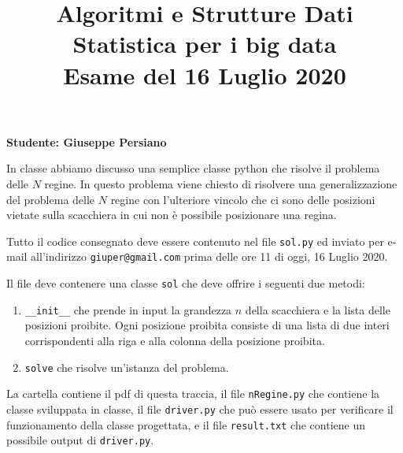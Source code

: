 \documentclass{amsart}
\begin{document}
\title{Algoritmi e Strutture Dati\\
Statistica per i big data\\
Esame del 16 Luglio 2020
}


\newcommand{\NomeStudente}{sol}
\newcommand{\nomeClasse}{sol}


\maketitle

\hfill{{\bf Studente: Giuseppe Persiano}}

\smallskip

In classe abbiamo discusso una semplice classe python che risolve il 
problema delle $N$ regine.
In questo problema viene chiesto di risolvere una generalizzazione 
del problema  delle $N$ regine con l'ulteriore vincolo che ci sono 
delle posizioni vietate sulla scacchiera in cui non \`e possibile 
posizionare una regina.


\medskip{}
Tutto il codice consegnato deve essere contenuto nel file
{\tt \nomeClasse .py} ed inviato per e-mail all'indirizzo
{\tt giuper@gmail.com} prima delle ore 11 di oggi, 16 Luglio 2020.

Il file deve contenere una classe {\tt \nomeClasse} che deve offrire
i seguenti due metodi:
\begin{enumerate}
\item {\tt \_\_init\_\_} che prende in input la grandezza $n$ della scacchiera
e la lista delle posizioni proibite. Ogni posizione proibita consiste di una lista di due interi corrispondenti alla riga e alla colonna della posizione
proibita.
\item {\tt solve} che risolve un'istanza del problema.
\end{enumerate}

La cartella contiene il pdf di questa traccia, il file
{\tt nRegine.py} che contiene la classe sviluppata in classe,
il file {\tt driver.py} che pu\`o essere usato
per verificare il funzionamento della classe progettata, e il file  {\tt result.txt} che contiene
un possibile output di {\tt driver.py}.
\end{document}
